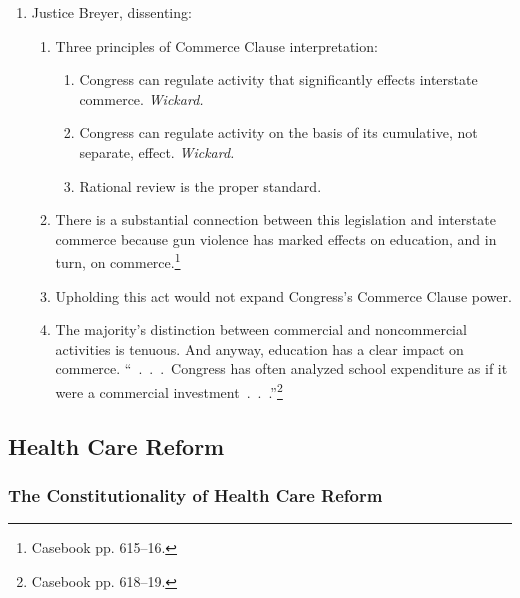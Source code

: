 \begin{enumerate}
\begin{enumerate}
        determinative.\footnote{Casebook pp. 613--14.}
    \end{enumerate}
    \item Justice Breyer, dissenting:
    \begin{enumerate}
        \item Three principles of Commerce Clause interpretation:
        \begin{enumerate}
            \item Congress can regulate activity that significantly effects 
            interstate commerce. \emph{Wickard.}
            \item Congress can regulate activity on the basis of its 
            cumulative, not separate, effect. \emph{Wickard.}
            \item Rational review is the proper standard.
        \end{enumerate}
        \item There is a substantial connection between this legislation and 
        interstate commerce because gun violence has marked effects on 
        education, and in turn, on commerce.\footnote{Casebook pp. 615--16.}
        \item Upholding this act would not expand Congress's Commerce Clause 
        power.
        \item The majority's distinction between commercial and noncommercial 
        activities is tenuous. And anyway, education has a clear impact on 
        commerce. ``~.~.~.~Congress has often analyzed school expenditure as 
        if it were a commercial investment~.~.~.''\footnote{Casebook pp. 
        618--19.}
    \end{enumerate}
\end{enumerate}
 
\subsection{Health Care Reform}

\subsubsection{The Constitutionality of Health Care Reform}

